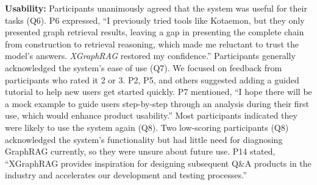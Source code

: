 \textbf{Usability:} Participants unanimously agreed that the system was useful for their tasks (Q6). P6 expressed, ``I previously tried tools like Kotaemon, but they only presented graph retrieval results, leaving a gap in presenting the complete chain from construction to retrieval reasoning, which made me reluctant to trust the model's answers. \textit{XGraphRAG} restored my confidence.''
Participants generally acknowledged the system's ease of use (Q7). We focused on feedback from participants who rated it 2 or 3. P2, P5, and others suggested adding a guided tutorial to help new users get started quickly. P7 mentioned, ``I hope there will be a mock example to guide users step-by-step through an analysis during their first use, which would enhance product usability.'' 
Most participants indicated they were likely to use the system again (Q8). Two low-scoring participants (Q8) acknowledged the system's functionality but had little need for diagnosing GraphRAG currently, so they were unsure about future use. P14 stated, ``XGraphRAG provides inspiration for designing subsequent Q\&A products in the industry and accelerates our development and testing processes.''